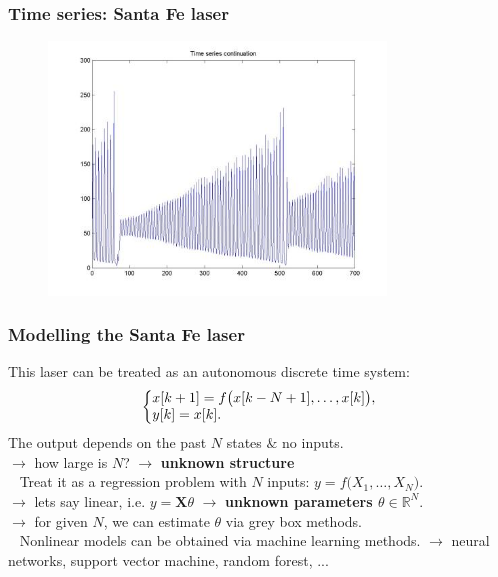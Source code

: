 \documentclass{beamer}
\begin{document}
\begin{frame}
\frametitle{Time series: Santa Fe laser}
\begin{figure}[!h]
  \centering
  \includegraphics[width=0.8\textwidth]{santafe-full.jpg}
\end{figure}
\end{frame}

\begin{frame}
\frametitle{Modelling the Santa Fe laser}
This laser can be treated as an autonomous discrete time system:
\begin{align*}
\left\{ \begin{matrix} 
x[k+1] = f\big(x[k-N+1], \ldots, x[k]\big), \\
y[k] = x[k]. \hfill
\end{matrix}\right.
\end{align*}
The output depends on the past $N$ states $\&$ no inputs.\\
\pause
$\rightarrow$ how large is $N$? $\rightarrow$ \textbf{unknown structure} \\
\ \newline
\pause
Treat it as a regression problem with $N$ inputs: $y = f\big(X_1,\ldots,X_N\big)$. \\
\pause
$\rightarrow$ lets say linear, i.e. $y = \mathbf{X}\theta$ $\rightarrow$ \textbf{unknown parameters $\theta \in \mathbb{R}^N$}. \\
\pause
$\rightarrow$ for given $N$, we can estimate $\theta$ via grey box methods.\\
\ \newline
\pause
Nonlinear models can be obtained via machine learning methods.
$\rightarrow$ neural networks, support vector machine, random forest, ...
\end{frame}
\end{document}
